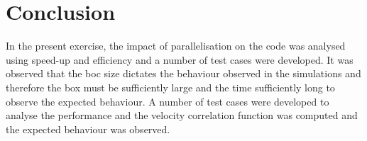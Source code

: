 \documentclass[11pt, oneside]{article}
\begin{document}
 

\section{Conclusion}
In the present exercise, the impact of parallelisation on the code was analysed using speed-up and efficiency and a number of test cases were developed. It was observed that the boc size dictates the behaviour observed in the simulations and therefore the box must be sufficiently large and the time sufficiently long to observe the expected behaviour. A number of test cases were developed to analyse the performance and the velocity correlation function was computed and the expected behaviour was observed. 



\end{document}
